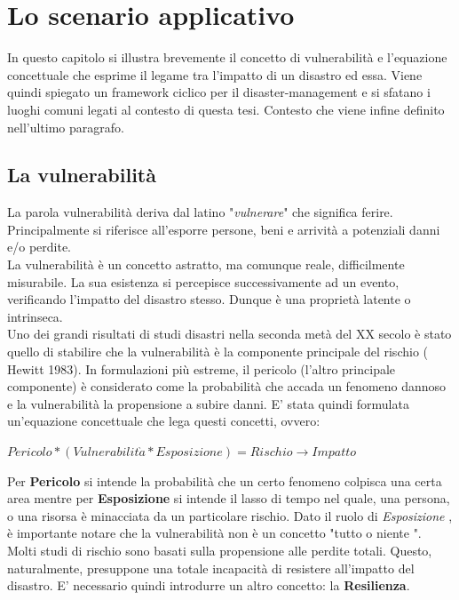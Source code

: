 \chapter{Lo scenario applicativo}
\label{scenario}
In questo capitolo si illustra brevemente il concetto di vulnerabilità e l'equazione concettuale che esprime il legame tra l'impatto di un disastro ed essa. Viene quindi spiegato un framework ciclico per il disaster-management e si sfatano i luoghi comuni legati al contesto di questa tesi. Contesto che viene infine definito nell'ultimo paragrafo.


\section{La vulnerabilità}
\label{vuln}

La parola vulnerabilità \cite{NOTE} deriva dal latino "\textit{vulnerare}" che significa ferire. Principalmente si riferisce all'esporre persone, beni e arrività a potenziali danni e/o perdite. \\
La vulnerabilità è un concetto astratto, ma comunque reale, difficilmente misurabile.  La sua esistenza si percepisce successivamente ad un evento, verificando l'impatto del disastro stesso. Dunque è una proprietà latente o intrinseca.\\
Uno dei grandi risultati di studi disastri nella seconda metà del XX secolo è stato quello di stabilire che la vulnerabilità è la componente principale del rischio ( Hewitt 1983). In formulazioni più estreme, il pericolo (l'altro principale componente) è considerato come la probabilità che accada un fenomeno dannoso e la vulnerabilità la propensione a subire danni. E' stata quindi formulata un'equazione concettuale che lega questi concetti, ovvero:
\begin{center}
$Pericolo * (Vulnerabilit\grave{a} *Esposizione ) = Rischio \rightarrow Impatto$
\end{center}
\newpage
Per \textbf{Pericolo} si intende la probabilità che un certo fenomeno colpisca una certa area mentre per \textbf{Esposizione} si intende il lasso di tempo nel quale, una persona, o una risorsa è minacciata da un particolare rischio. 
Dato il ruolo di \textit{Esposizione} , è importante notare che la vulnerabilità non è un concetto "tutto o niente ". \\
Molti studi di rischio sono basati sulla propensione alle perdite totali. Questo, naturalmente, presuppone una totale incapacità di resistere all'impatto del disastro. E' necessario quindi introdurre un altro concetto: la \textbf{Resilienza}.
